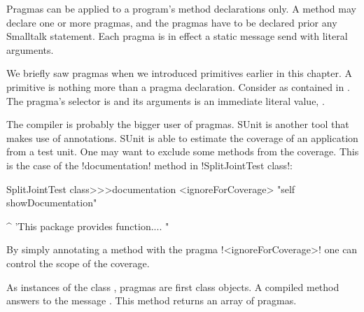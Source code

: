 \documentclass[a4paper,10pt,twoside]{book}
\begin{document}
{Pragmas can be applied to a program's method declarations only. A method may declare one or more pragmas, and the pragmas have to be declared prior any Smalltalk statement. Each pragma is in effect a static message send with literal arguments.

We briefly saw pragmas when we introduced primitives earlier in this chapter. A primitive is nothing more than a pragma declaration.
Consider  as contained in . The pragma's selector is  and its arguments is an immediate literal value, .

The compiler is probably the bigger user of pragmas. SUnit is another tool that makes use of annotations. SUnit is able to estimate the coverage of an application from a test unit. One may want to exclude some methods from the coverage. This is the case of the \ct!documentation! method in \ct!SplitJointTest class!:

\begin{code}{}
SplitJointTest class>>>documentation
        <ignoreForCoverage>
        "self showDocumentation"

        ^ 'This package provides function.... "
\end{code}

By simply annotating a method with the pragma \ct!<ignoreForCoverage>! one can control the scope of the coverage.


%


As instances of the class , pragmas are first class objects. A compiled method answers to the message . This method returns an array of pragmas.

}
\end{document}
